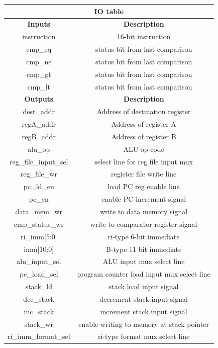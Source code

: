 \documentclass{article}
\begin{document}
\begin{par}
	\begin{center}
		\begin{tabular}{|c|c|}
			\hline 
			\multicolumn{2}{|c|}{\textbf{IO table}} \\
			\hline 
			\textbf{Inputs} & \textbf{Description} \\ 
			\hline 
			instruction & 16-bit instruction \\ 
			\hline 
			cmp\_eq & status bit from last comparison \\ 
			\hline 
			cmp\_ne & status bit from last comparison \\ 
			\hline 
			cmp\_gt & status bit from last comparison \\ 
			\hline 
			cmp\_lt & status bit from last comparison \\ 
			\hline 
			\textbf{Outputs} & \textbf{Description} \\ 
			\hline 
			dest\_addr & Address of destination register \\
			\hline
			regA\_addr & Address of register A \\
			\hline
			regB\_addr & Address of register B \\
			\hline
			alu\_op & ALU op code \\
			\hline
			reg\_file\_input\_sel & select line for reg file input mux \\
			\hline
			reg\_file\_wr & register file write line \\ 
			\hline 
			pc\_ld\_en & load PC reg enable line \\ 
			\hline 
			pc\_en & enable PC increment signal \\ 
			\hline 
			data\_mem\_wr & write to data memory signal \\ 
			\hline 
			cmp\_status\_wr & write to comparator register signal \\ 
			\hline 
			ri\_imm[5:0] & ri-type 6-bit immediate \\ 
			\hline 
			imm[10:0] & B-type 11 bit immediate \\ 
			\hline 
			alu\_input\_sel & ALU input mux select line \\ 
			\hline 
			pc\_load\_sel & program counter load input mux select line \\ 
			\hline 
			stack\_ld & stack load input signal \\ 
			\hline 
			dec\_stack & decrement stack input signal \\ 
			\hline 
			inc\_stack & increment stack input signal \\ 
			\hline 
			stack\_wr & enable writing to memory at stack pointer \\ 
			\hline 
			ri\_imm\_format\_sel & ri-type format mux select line \\ 
			\hline 
		\end{tabular} 
	\end{center}
	

\end{par}
\end{document}
